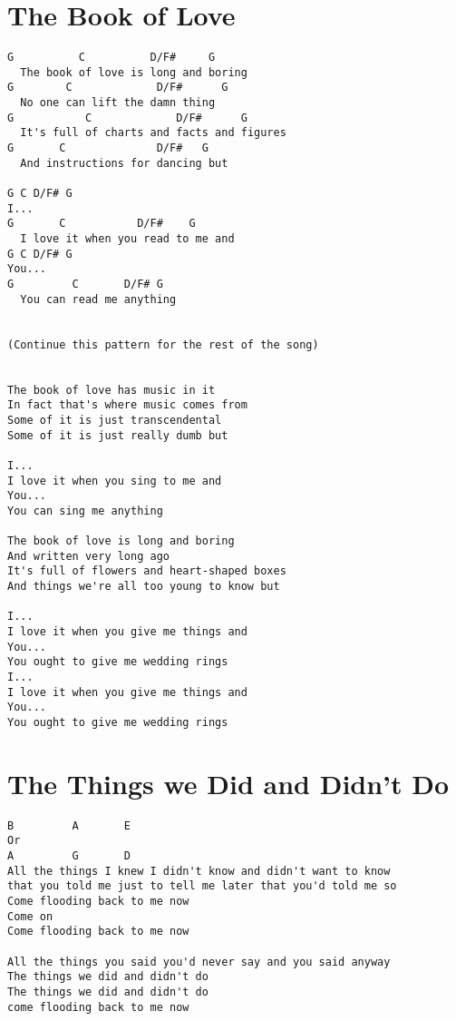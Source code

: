 \documentclass[leqno]{memoir}
\begin{document}
\chapter{The Book of Love}
\begin{verbatim}
G          C          D/F#     G
  The book of love is long and boring
G        C             D/F#      G    
  No one can lift the damn thing 
G           C             D/F#      G
  It's full of charts and facts and figures
G       C              D/F#   G
  And instructions for dancing but

G C D/F# G
I...
G       C           D/F#    G
  I love it when you read to me and
G C D/F# G
You...
G         C       D/F# G
  You can read me anything


(Continue this pattern for the rest of the song)


The book of love has music in it
In fact that's where music comes from
Some of it is just transcendental
Some of it is just really dumb but

I...
I love it when you sing to me and
You...
You can sing me anything

The book of love is long and boring
And written very long ago
It's full of flowers and heart-shaped boxes
And things we're all too young to know but

I...
I love it when you give me things and
You...
You ought to give me wedding rings
I...
I love it when you give me things and
You...
You ought to give me wedding rings
\end{verbatim}
\newpage

\chapter{The Things we Did and Didn't Do}
\begin{verbatim}
B         A       E
Or
A         G       D
All the things I knew I didn't know and didn't want to know
that you told me just to tell me later that you'd told me so
Come flooding back to me now
Come on
Come flooding back to me now

All the things you said you'd never say and you said anyway
The things we did and didn't do
The things we did and didn't do
come flooding back to me now 
\end{verbatim}
\newpage
\end{document}
